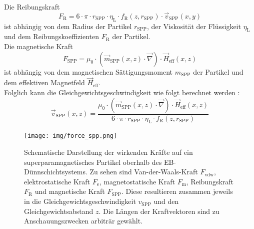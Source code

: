 \documentclass[page,pdftex,12pt,a4paper,twoside,openright]{scrbook}
\begin{document}
Die Reibungskraft\\
\begin{equation}
F_\mathrm{R} = 6 \cdot \pi \cdot r_\mathrm{SPP} \cdot \eta_\mathrm{L} \cdot f_\mathrm{R}(z,r_\mathrm{SPP}) \cdot \vec{v}_\mathrm{SPP}(x,y)
\end{equation}
ist abhängig von dem Radius der Partikel \(r_\mathrm{SPP}\), der Viskosität der Flüssigkeit \(\eta_\mathrm{L}\) und dem Reibungskoeffizienten \(F_\mathrm{R}\) der Partikel.\\

Die magnetische Kraft\\
\begin{equation}
F_\mathrm{SPP} = \mu_0 \cdot (\vec{m}_\mathrm{SPP}(x,z) \cdot \vec{\nabla}) \cdot \vec{H}_\mathrm{eff}(x,z)
\end{equation}
ist abhängig von dem magnetischen Sättigungsmoment \(m_\mathrm{SPP}\) der Partikel und dem effektiven Magnetfeld \(\vec{H}_\mathrm{eff}\).\\

Folglich kann die Gleichgewichtsgeschwindigkeit wie folgt berechnet werden \cite{holzinger_transport_2015}:\\
\begin{equation}
\label{eq-v_spp}
\vec{v}_\mathrm{SPP} (x,z) =
\frac{ \mu_0 \cdot (\vec{m}_\mathrm{SPP}(x,z) \cdot \vec{\nabla}) \cdot \vec{H}_\mathrm{eff}(x,z)}
{6 \cdot \pi \cdot r_\mathrm{SPP} \cdot \eta_\mathrm{L} \cdot f_\mathrm{R}(z,r_\mathrm{SPP})}
\end{equation}

\begin{figure}[h]
\centering
\texttt{[image: img/force\_spp.png]}
\caption{\label{fig-force_spp}
Schematische Darstellung der wirkenden Kräfte auf ein superparamagnetisches Partikel oberhalb des EB-Dünnschichtsystems. Zu sehen sind Van-der-Waals-Kraft \(F_\mathrm{vdw}\), elektrostatische Kraft \(F_\mathrm{e}\), magnetostatische Kraft \(F_\mathrm{m}\), Reibungskraft \(F_\mathrm{R}\) und magnetische Kraft \(F_\mathrm{SPP}\). Diese resultieren zusammen jeweils in die Gleichgewichtsgeschwindigkeit \(v_\mathrm{SPP}\) und den Gleichgewichtsabstand \(z\). Die Längen der Kraftvektoren sind zu Anschauungszwecken arbiträr gewählt.}
\end{figure}
\end{document}
